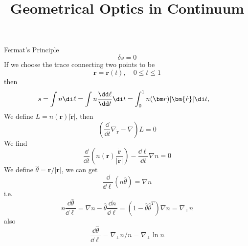 \documentclass[12pt]{article}
\title{Geometrical Optics in Continuum}
\author{\zpj}
\begin{document}
\maketitle
Fermat's Principle
\[\delta s=0\]
If we choose the trace connecting two points to be
\[\bm r=\bm r(t),\quad 0\leq t\leq 1\]
then
\[
s=\int n\di \ell=\int n\frac{\dd \ell}{\dd t}\di t=\int_0^1 n(\bm r)|\bm{\dot r}|\di t,\quad 
\]
We define $L=n(\bm r)|\bm{\dot r}|$, then
\[\left(\frac{\dd}{\dd t}\nabla_{\bm{\dot r}}-\nabla\right)L=0
\]
We find \[\frac{\dd}{\dd t}\left(n(\bm r)\frac{\bm{\dot r}}{|\bm{\dot r}|}\right)-\frac{\dd\ell}{\dd t}\nabla n=0
\]
We define $\hat{\theta}=\bm{\dot r}/|\bm{\dot r}|$, we can get \[\frac{\dd}{\dd \ell}\left(n\hat\theta \right)=\nabla n 
\]
i.e. \[n\frac{\dd \hat\theta}{\dd \ell}=\nabla n-\hat{\theta}\frac{\dd n}{\dd \ell}=\left(1-\hat{\theta}\hat{\theta}^T\right)\nabla n=\nabla_\perp n
\]
also\[\frac{\dd \hat\theta}{\dd \ell}=\nabla_\perp n/n=\nabla_\perp \ln n
\]
\end{document}
